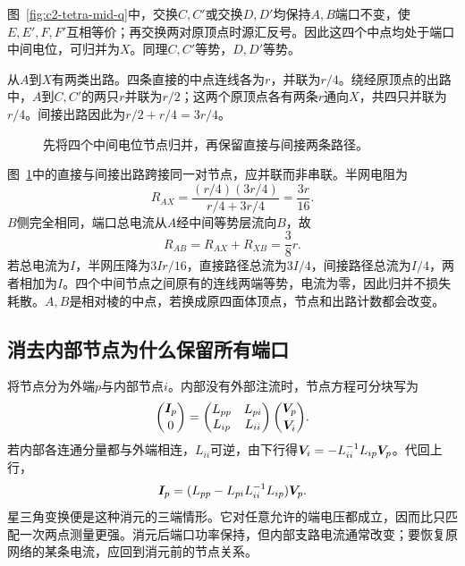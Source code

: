 \begin{solution}
图~\ref{fig:c2-tetra-mid-q}中，交换$C,C'$或交换$D,D'$均保持$A,B$端口不变，使$E,E',F,F'$互相等价；再交换两对原顶点时源汇反号。因此这四个中点均处于端口中间电位，可归并为$X$。同理$C,C'$等势，$D,D'$等势。

从$A$到$X$有两类出路。四条直接的中点连线各为$r$，并联为$r/4$。绕经原顶点的出路中，$A$到$C,C'$的两只$r$并联为$r/2$；这两个原顶点各有两条$r$通向$X$，共四只并联为$r/4$。间接出路因此为$r/2+r/4=3r/4$。
\begin{figure}[H]\centering
{}
\caption{先将四个中间电位节点归并，再保留直接与间接两条路径。}\label{fig:c2-tetra-mid-s}
\end{figure}
图~\ref{fig:c2-tetra-mid-s}中的直接与间接出路跨接同一对节点，应并联而非串联。半网电阻为
\[
 R_{AX}=\frac{(r/4)(3r/4)}{r/4+3r/4}=\frac{3r}{16}.
\]
$B$侧完全相同，端口总电流从$A$经中间等势层流向$B$，故
\[
 \boxed{R_{AB}=R_{AX}+R_{XB}=\frac38r}.
\]
若总电流为$I$，半网压降为$3Ir/16$，直接路径总流为$3I/4$，间接路径总流为$I/4$，两者相加为$I$。四个中间节点之间原有的连线两端等势，电流为零，因此归并不损失耗散。$A,B$是相对棱的中点，若换成原四面体顶点，节点和出路计数都会改变。
\end{solution}



\subsection{消去内部节点为什么保留所有端口}
将节点分为外端$p$与内部节点$i$。内部没有外部注流时，节点方程可分块写为
\[
 \binom{\bm{I}_p}{0}=
 \begin{pmatrix}L_{pp}&L_{pi}\\L_{ip}&L_{ii}\end{pmatrix}
 \binom{\bm{V}_p}{\bm{V}_i}.
\]
若内部各连通分量都与外端相连，$L_{ii}$可逆，由下行得$\bm{V}_i=-L_{ii}^{-1}L_{ip}\bm{V}_p$。代回上行，
\[
 \bm{I}_p=(L_{pp}-L_{pi}L_{ii}^{-1}L_{ip})\bm{V}_p.
\]
星三角变换便是这种消元的三端情形。它对任意允许的端电压都成立，因而比只匹配一次两点测量更强。消元后端口功率保持，但内部支路电流通常改变；要恢复原网络的某条电流，应回到消元前的节点关系。


